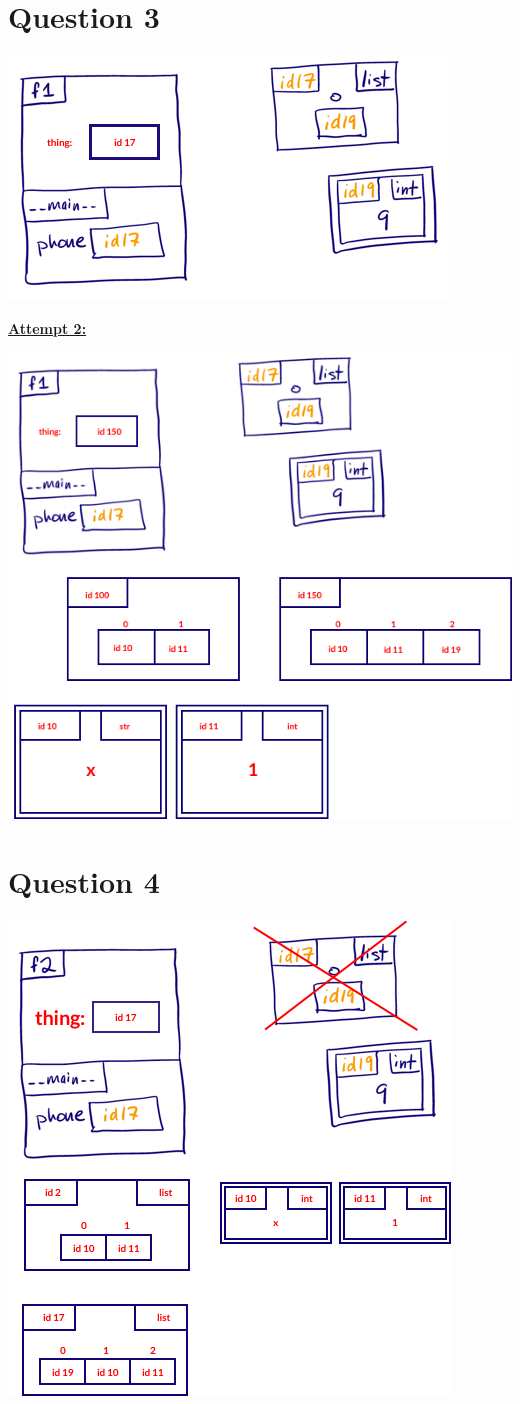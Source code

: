 \documentclass[12pt]{article}
\begin{document}
\section*{Question 3}
\begin{center}
\includegraphics[width=0.5\linewidth]{images/worksheet_1_q3_solution.png}
\end{center}

\bigskip

\begin{mdframed}
    \underline{\textbf{Attempt 2:}}

    \bigskip

    \begin{center}
    \includegraphics[width=0.5\linewidth]{images/worksheet_1_q3_correction.png}
    \end{center}

\end{mdframed}

\section*{Question 4}
\begin{center}
\includegraphics[width=0.5\linewidth]{images/worksheet_1_q4_solution.png}
\end{center}
\end{document}
